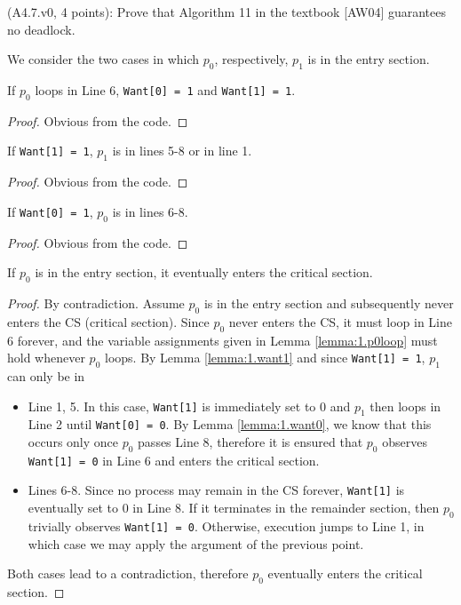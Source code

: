 \begin{Exc}{(A4.7.v0, 4 points):}
Prove that Algorithm 11 in the textbook [AW04] guarantees no deadlock.
\end{Exc}

We consider the two cases in which $p_0$, respectively, $p_1$
is in the entry section.

\begin{lemma} \label{lemma:1.p0loop}
If $p_0$ loops in Line 6, \lstinline|Want[0] = 1| and \lstinline|Want[1] = 1|.
\end{lemma}

\begin{proof}
Obvious from the code.
\end{proof}

\begin{lemma} \label{lemma:1.want1}
If \lstinline|Want[1] = 1|, $p_1$ is in lines 5-8 or in line 1.
\end{lemma}

\begin{proof}
Obvious from the code.
\end{proof}

\begin{lemma} \label{lemma:1.want0}
If \lstinline|Want[0] = 1|, $p_0$ is in lines 6-8.
\end{lemma}

\begin{proof}
Obvious from the code.
\end{proof}

\begin{lemma} \label{lemma:1.p0}
If $p_0$ is in the entry section, it eventually enters the critical section.
\end{lemma}

\begin{proof}
By contradiction. Assume $p_0$ is in the entry section and subsequently
never enters the CS (critical section).
Since $p_0$ never enters the CS, it must loop in Line 6 forever, and
the variable assignments given in Lemma \ref{lemma:1.p0loop} must hold
whenever $p_0$ loops. By Lemma \ref{lemma:1.want1} and since 
\lstinline|Want[1] = 1|, $p_1$ can only be in

\begin{itemize}
\item Line 1, 5. In this case, \lstinline|Want[1]| is immediately set to 0 and $p_1$
      then loops in Line 2 until \lstinline|Want[0] = 0|. By Lemma \ref{lemma:1.want0},
      we know that this occurs only once $p_0$ passes Line 8, therefore
      it is ensured that $p_0$ observes \lstinline|Want[1] = 0| in Line 6 and
      enters the critical section.
\item Lines 6-8. Since no process may remain in the CS forever, \lstinline|Want[1]|
      is eventually set to 0 in Line 8. If it terminates in the remainder section,
      then $p_0$ trivially observes \lstinline|Want[1] = 0|. Otherwise, execution
      jumps to Line 1, in which case we may apply the argument of the previous point.      
\end{itemize}

Both cases lead to a contradiction, therefore $p_0$ eventually enters the critical
section.
\end{proof}


